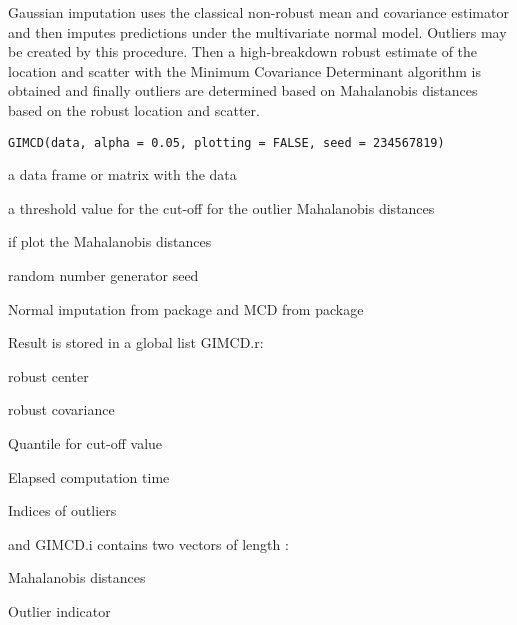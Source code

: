 %
\begin{Description}\relax
Gaussian imputation uses the classical non-robust mean and covariance estimator and then imputes predictions under the multivariate normal model. Outliers may be created by this procedure. Then a high-breakdown robust estimate of the location and scatter with the Minimum Covariance Determinant algorithm is obtained and finally outliers are determined based on Mahalanobis distances based on the robust location and scatter.
\end{Description}
%
\begin{Usage}
\begin{verbatim}
GIMCD(data, alpha = 0.05, plotting = FALSE, seed = 234567819)
\end{verbatim}
\end{Usage}
%
\begin{Arguments}
\begin{ldescription}
\item[\code{data}]  a data frame or matrix with the data 
\item[\code{alpha}]  a threshold value for the cut-off for the outlier Mahalanobis distances 
\item[\code{plotting}] if  plot the Mahalanobis distances 
\item[\code{seed}]  random number generator seed 
\end{ldescription}
\end{Arguments}
%
\begin{Details}\relax
Normal imputation from package  and MCD from package 
\end{Details}
%
\begin{Value}
Result is stored in a global list GIMCD.r:
\begin{ldescription}
\item[\code{center }] robust center
\item[\code{scatter }] robust covariance
\item[\code{alpha}] Quantile for cut-off value
\item[\code{computation.time}] Elapsed computation time
\item[\code{outliers}] Indices of outliers
\end{ldescription}
and GIMCD.i contains two vectors of length :
\begin{ldescription}
\item[\code{dist}] Mahalanobis distances
\item[\code{outind}] Outlier indicator
\end{ldescription}
\end{Value}
